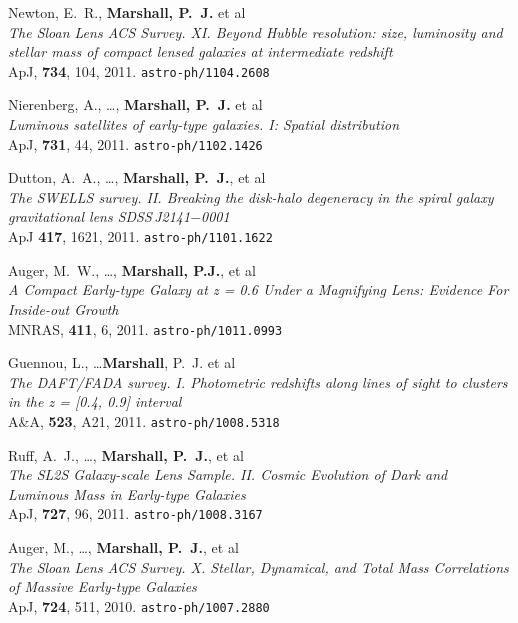\begin{revnumerate}
\item{{Newton}, E.~R., \textbf{{Marshall}, P.~J.} et al\\
\textit{The Sloan Lens ACS Survey. XI. Beyond Hubble resolution: size, luminosity and stellar mass of compact lensed galaxies at intermediate redshift}\\
ApJ, \textbf{734}, 104, 2011.
\texttt{astro-ph/1104.2608}
}


\item{{Nierenberg}, A., \ldots, \textbf{{Marshall}, P.~J.} et al\\
\textit{Luminous satellites of early-type galaxies. I: Spatial distribution}\\
ApJ, \textbf{731}, 44, 2011.
\texttt{astro-ph/1102.1426}
}

\item{{Dutton}, A.~A., \ldots, \textbf{{Marshall}, P.~J.}, et al\\
\textit{The SWELLS survey. II.  Breaking the disk-halo degeneracy in the
spiral galaxy gravitational lens SDSS\,J2141$-$0001}\\
ApJ \textbf{417}, 1621, 2011.
\texttt{astro-ph/1101.1622}
}

\item{Auger, M.~W., \ldots, \textbf{Marshall, P.J.}, et al\\
\textit{A Compact Early-type Galaxy at z = 0.6 Under a Magnifying Lens: Evidence For Inside-out Growth}\\
MNRAS, \textbf{411}, 6, 2011.
\texttt{astro-ph/1011.0993}
}

\item{{Guennou}, L., \ldots \textbf{Marshall}, P.~J. et al\\
\textit{The DAFT/FADA survey. I. Photometric redshifts along lines of sight to clusters in the z = [0.4, 0.9] interval}\\
A\&A, \textbf{523}, A21, 2011.
\texttt{astro-ph/1008.5318}
}

\item{{Ruff}, A.~J., \ldots, \textbf{{Marshall}, P.~J.}, et al\\
\textit{The SL2S Galaxy-scale Lens Sample.  II. Cosmic Evolution of
Dark and Luminous Mass in Early-type Galaxies}\\
ApJ, \textbf{727}, 96, 2011.
\texttt{astro-ph/1008.3167}
}

\item{{Auger}, M., \dots, \textbf{{Marshall}, P.~J.}, et al\\
\textit{The Sloan Lens ACS Survey. X. Stellar, Dynamical, and Total Mass
Correlations of Massive Early-type Galaxies}\\
ApJ, \textbf{724}, 511, 2010.
\texttt{astro-ph/1007.2880}
}


\end{revnumerate}
